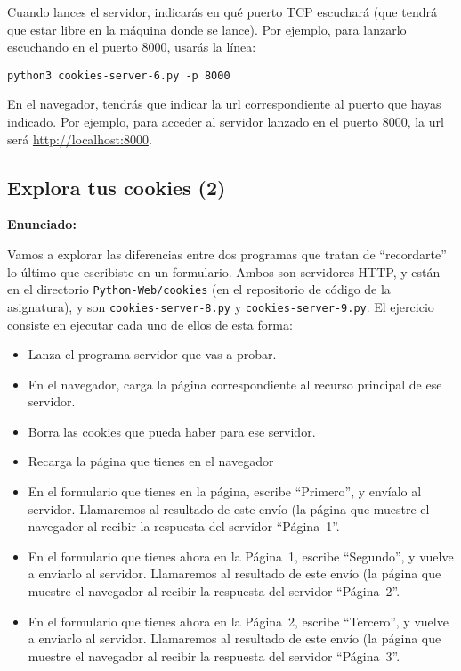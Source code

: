 Cuando lances el servidor, indicarás en qué puerto TCP escuchará (que tendrá que estar libre en la máquina donde se lance). Por ejemplo, para lanzarlo escuchando en el puerto 8000, usarás la línea:

\begin{verbatim}
python3 cookies-server-6.py -p 8000
\end{verbatim}

En el navegador, tendrás que indicar la url correspondiente al puerto que hayas indicado. Por ejemplo, para acceder al servidor lanzado en el puerto 8000, la url será \url{http://localhost:8000}.

\subsection{Explora tus cookies (2)}
\label{subsec:explora-cookies-2}

\textbf{Enunciado:}

Vamos a explorar las diferencias entre dos programas que tratan de ``recordarte'' lo último que escribiste en un formulario. Ambos son servidores HTTP, y están en el directorio \verb|Python-Web/cookies| (en el repositorio de código de la asignatura), y son \verb|cookies-server-8.py| y \verb|cookies-server-9.py|. El ejercicio consiste en ejecutar cada uno de ellos de esta forma:

\begin{itemize}
\item Lanza el programa servidor que vas a probar.
\item En el navegador, carga la página correspondiente al recurso principal de ese servidor.
\item Borra las cookies que pueda haber para ese servidor.
\item Recarga la página que tienes en el navegador
\item En el formulario que tienes en la página, escribe ``Primero'', y envíalo al servidor. Llamaremos al resultado de este envío (la página que muestre el navegador al recibir la respuesta del servidor ``Página~1''.
\item En el formulario que tienes ahora en la Página~1, escribe ``Segundo'', y vuelve a enviarlo al servidor. Llamaremos al resultado de este envío (la página que muestre el navegador al recibir la respuesta del servidor ``Página~2''.
\item En el formulario que tienes ahora en la Página~2, escribe ``Tercero'', y vuelve a enviarlo al servidor. Llamaremos al resultado de este envío (la página que muestre el navegador al recibir la respuesta del servidor ``Página~3''.
\end{itemize}

